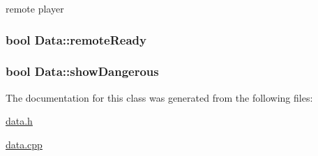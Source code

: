 remote player 

\subsubsection[{\texorpdfstring{remote\+Ready}{remoteReady}}]{\setlength{\rightskip}{0pt plus 5cm}bool Data\+::remote\+Ready\hspace{0.3cm}{\ttfamily [private]}}\hypertarget{classData_a611e221f2d956e25eee03fc88d2bd453}{}\label{classData_a611e221f2d956e25eee03fc88d2bd453}
\subsubsection[{\texorpdfstring{show\+Dangerous}{showDangerous}}]{\setlength{\rightskip}{0pt plus 5cm}bool Data\+::show\+Dangerous}\hypertarget{classData_a2909d285f3adfe5a61c8ea181cd7824c}{}\label{classData_a2909d285f3adfe5a61c8ea181cd7824c}


The documentation for this class was generated from the following files\+:\begin{DoxyCompactItemize}
\item 
\hyperlink{data_8h}{data.\+h}\item 
\hyperlink{data_8cpp}{data.\+cpp}\end{DoxyCompactItemize}
